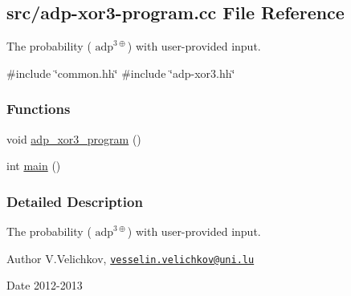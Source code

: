 \hypertarget{adp-xor3-program_8cc}{\subsection{src/adp-\/xor3-\/program.cc \-File \-Reference}
\label{adp-xor3-program_8cc}
}


\-The probability ( $\mathrm{adp}^{3\oplus}$) with user-\/provided input.  


{\ttfamily \#include \char`\"{}common.\-hh\char`\"{}}\*
{\ttfamily \#include \char`\"{}adp-\/xor3.\-hh\char`\"{}}\*
\subsubsection*{\-Functions}
\begin{DoxyCompactItemize}
\item 
void \hyperlink{adp-xor3-program_8cc_a756d6d507c28545aa131259d8e44687a}{adp\-\_\-xor3\-\_\-program} ()
\item 
int \hyperlink{adp-xor3-program_8cc_ae66f6b31b5ad750f1fe042a706a4e3d4}{main} ()
\end{DoxyCompactItemize}


\subsubsection{\-Detailed \-Description}
\-The probability ( $\mathrm{adp}^{3\oplus}$) with user-\/provided input. \begin{DoxyAuthor}{\-Author}
\-V.\-Velichkov, \href{mailto:vesselin.velichkov@uni.lu}{\tt vesselin.\-velichkov@uni.\-lu} 
\end{DoxyAuthor}
\begin{DoxyDate}{\-Date}
2012-\/2013 
\end{DoxyDate}



